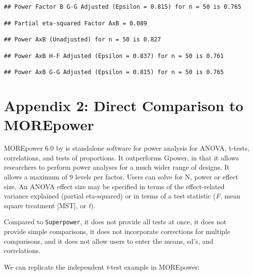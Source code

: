 \documentclass[]{book}
\begin{document}
\begin{verbatim}
## Power Factor B G-G Adjusted (Epsilon = 0.815) for n = 50 is 0.765
\end{verbatim}

\begin{verbatim}
## Partial eta-squared Factor AxB = 0.089
\end{verbatim}

\begin{verbatim}
## Power AxB (Unadjusted) for n = 50 is 0.827
\end{verbatim}

\begin{verbatim}
## Power AxB H-F Adjusted (Epsilon = 0.837) for n = 50 is 0.761
\end{verbatim}

\begin{verbatim}
## Power AxB G-G Adjusted (Epsilon = 0.815) for n = 50 is 0.765
\end{verbatim}

\hypertarget{appendix-2-direct-comparison-to-morepower}{%
\chapter*{Appendix 2: Direct Comparison to MOREpower}\label{appendix-2-direct-comparison-to-morepower}}

MOREpower 6.0 by \citet{Campbell2012MorePower6F} is standalone software for power analysis for ANOVA, t-tests, correlations, and tests of proportions. It outperforms Gpower, in that it allows researchers to perform power analyses for a much wider range of designs. It allows a maximum of 9 levels per factor. Users can solve for N, power or effect size. An ANOVA effect size may be specified in terms of the effect-related variance explained (partial eta-squared) or in terms of a test statistic (\emph{F}, mean square treatment {[}MST{]}, or \emph{t}).

Compared to \texttt{Superpower}, it does not provide all tests at once, it does not provide simple comparisons, it does not incorporate corrections for multiple comparisons, and it does not allow users to enter the means, sd's, and correlations.

We can replicate the independent \emph{t}-test example in MOREpower:
\end{document}

